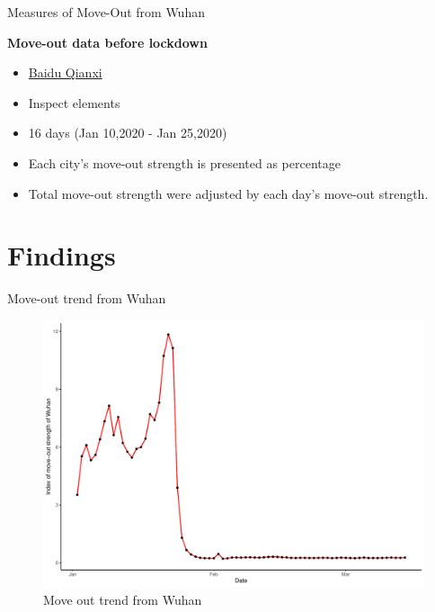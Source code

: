 \documentclass[10pt,ignorenonframetext,aspectratio=169,notes=hide,]{beamer}
\providecommand{\tightlist}{%
  \setlength{\itemsep}{0pt}\setlength{\parskip}{0pt}}
\begin{document}
\begin{frame}{Measures of Move-Out from Wuhan}
\protect\hypertarget{measures-of-move-out-from-wuhan}{}

\textbf{Move-out data before lockdown}

\begin{itemize}
\tightlist
\item
  \href{https://qianxi.baidu.com/2020/}{Baidu Qianxi}
\item
  Inspect elements
\item
  16 days (Jan 10,2020 - Jan 25,2020)
\item
  Each city's move-out strength is presented as percentage
\item
  Total move-out strength were adjusted by each day's move-out strength.
\end{itemize}

\end{frame}

\hypertarget{findings}{%
\section{Findings}\label{findings}}

\begin{frame}{Move-out trend from Wuhan}
\protect\hypertarget{move-out-trend-from-wuhan}{}

\begin{figure}
\centering
\includegraphics{slides_files/figure-beamer/fig1-1.pdf}
\caption{\label{fig:fig1}Move out trend from Wuhan}
\end{figure}

\end{frame}
\end{document}
